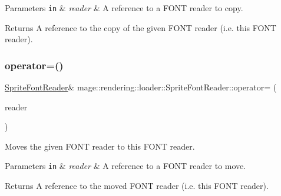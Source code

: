 \begin{DoxyParams}[1]{Parameters}
\mbox{\tt in}  & {\em reader} & A reference to a F\+O\+NT reader to copy. \\
\hline
\end{DoxyParams}
\begin{DoxyReturn}{Returns}
A reference to the copy of the given F\+O\+NT reader (i.\+e. this F\+O\+NT reader). 
\end{DoxyReturn}
\mbox{\label{classmage_1_1rendering_1_1loader_1_1_sprite_font_reader_ac6902b3475ae8425d475de59135a11a3}} 
\subsubsection{\texorpdfstring{operator=()}{operator=()}\hspace{0.1cm}{\footnotesize\ttfamily [2/2]}}
{\footnotesize\ttfamily \mbox{\hyperlink{classmage_1_1rendering_1_1loader_1_1_sprite_font_reader}{Sprite\+Font\+Reader}}\& mage\+::rendering\+::loader\+::\+Sprite\+Font\+Reader\+::operator= (\begin{DoxyParamCaption}\item[{\mbox{\hyperlink{classmage_1_1rendering_1_1loader_1_1_sprite_font_reader}{Sprite\+Font\+Reader}} \&\&}]{reader }\end{DoxyParamCaption})\hspace{0.3cm}{\ttfamily [delete]}}

Moves the given F\+O\+NT reader to this F\+O\+NT reader.


\begin{DoxyParams}[1]{Parameters}
\mbox{\tt in}  & {\em reader} & A reference to a F\+O\+NT reader to move. \\
\hline
\end{DoxyParams}
\begin{DoxyReturn}{Returns}
A reference to the moved F\+O\+NT reader (i.\+e. this F\+O\+NT reader). 
\end{DoxyReturn}
\mbox{\label{classmage_1_1rendering_1_1loader_1_1_sprite_font_reader_ae5b827dade3bd800e2000788efa91e30}} 
